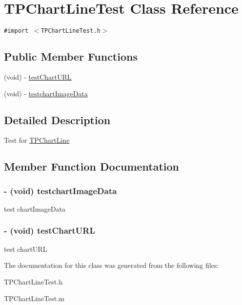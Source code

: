 \hypertarget{interface_t_p_chart_line_test}{
\section{TPChartLineTest Class Reference}
\label{interface_t_p_chart_line_test}
}
{\tt \#import $<$TPChartLineTest.h$>$}

\subsection*{Public Member Functions}
\begin{CompactItemize}
\item 
(void) - \hyperlink{interface_t_p_chart_line_test_bc71191c829b60b5b80e19302c5542c0}{testChartURL}
\item 
(void) - \hyperlink{interface_t_p_chart_line_test_9f089157f88c45c1965c569996cc6117}{testchartImageData}
\end{CompactItemize}


\subsection{Detailed Description}
Test for \hyperlink{interface_t_p_chart_line}{TPChartLine} 

\subsection{Member Function Documentation}
\hypertarget{interface_t_p_chart_line_test_9f089157f88c45c1965c569996cc6117}{
\subsubsection[{testchartImageData}]{\setlength{\rightskip}{0pt plus 5cm}- (void) testchartImageData }}
\label{interface_t_p_chart_line_test_9f089157f88c45c1965c569996cc6117}


test chartImageData \hypertarget{interface_t_p_chart_line_test_bc71191c829b60b5b80e19302c5542c0}{
\subsubsection[{testChartURL}]{\setlength{\rightskip}{0pt plus 5cm}- (void) testChartURL }}
\label{interface_t_p_chart_line_test_bc71191c829b60b5b80e19302c5542c0}


test chartURL 

The documentation for this class was generated from the following files:\begin{CompactItemize}
\item 
TPChartLineTest.h\item 
TPChartLineTest.m\end{CompactItemize}
